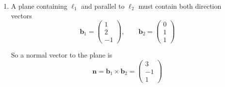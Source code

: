 \documentclass[leqno]{article}
\begin{document}
\begin{enumerate}[
  label=\textbf{\arabic*.},
  leftmargin=*,
  topsep=0pt,
  partopsep=0pt,
  parsep=0pt
]
\begin{djsSolution}
\begin{enumerate}[label=\textbf{(\roman*)}]
  Now find the scalar triple product:
  \begin{align*}
  (\mathbf a_2-\mathbf a_1)\cdot(\mathbf b_1\times\mathbf b_2)
  &=\begin{pmatrix}1\\-2\\-3\end{pmatrix}\cdot\begin{pmatrix}3\\-1\\1\end{pmatrix}\\
  &=1(3)+(-2)(-1)+(-3)(1)\\
  &=3+2-3\\
  &=2
  \end{align*}

  And
  \begin{align*}
  \left\lvert\mathbf b_1\times\mathbf b_2\right\rvert
  &=\sqrt{3^2+(-1)^2+1^2}\\
  &=\sqrt{11}
  \end{align*}

  Therefore
  \[
  \mathrm{dist}=\frac{|2|}{\sqrt{11}}=\frac{2}{\sqrt{11}}
  \]

  The shortest distance between \(\ell_1\) and \(\ell_2\) is \(\frac{2}{\sqrt{11}}\).

  \item A plane containing \(\ell_1\) and parallel to \(\ell_2\) must contain both direction vectors
  \[
  \mathbf b_1=\begin{pmatrix}1\\2\\-1\end{pmatrix},
  \qquad
  \mathbf b_2=\begin{pmatrix}0\\1\\1\end{pmatrix}
  \]

  So a normal vector to the plane is
  \[
  \mathbf n=\mathbf b_1\times\mathbf b_2=\begin{pmatrix}3\\-1\\1\end{pmatrix}
  \]


\end{enumerate}
\end{djsSolution}
\end{enumerate}
\end{document}
